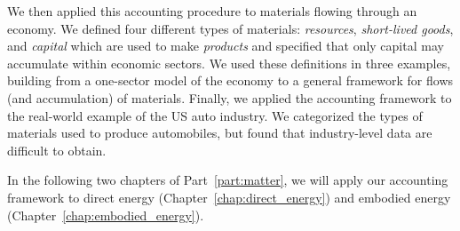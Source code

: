 We then applied this accounting procedure to materials 
flowing through an economy. 
We defined four different types of materials: \emph{resources},
\emph{short-lived goods}, and \emph{capital} which are used to make
\emph{products} and specified that only capital 
may accumulate within economic sectors.
We used these definitions in three examples,
building from a one-sector model of the economy
to a general framework for flows (and accumulation) 
of materials.
Finally, we applied the accounting framework to the 
real-world example of the US auto industry.
We categorized the types of materials used to produce
automobiles,
but found that industry-level data are difficult to obtain.

In the following two chapters of Part~\ref{part:matter},
we will apply our accounting framework 
to direct energy (Chapter~\ref{chap:direct_energy})
and embodied energy (Chapter~\ref{chap:embodied_energy}).







%
%


